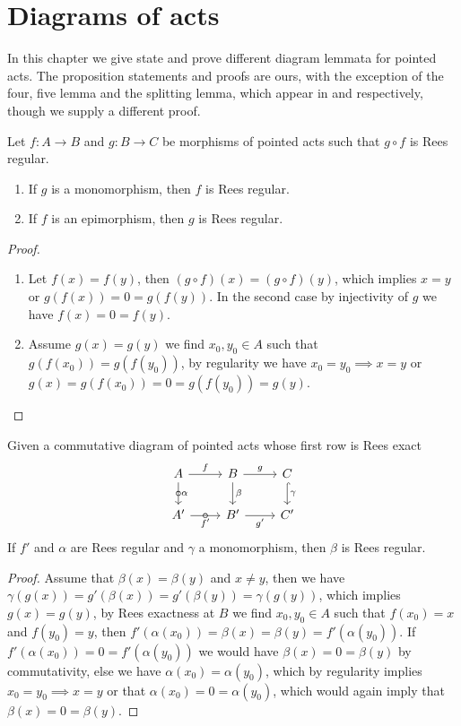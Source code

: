 \chapter{Diagrams of acts}
    In this chapter we give state and prove different diagram lemmata for pointed acts. The proposition statements and proofs are 
    ours, with the exception of the four, five lemma and the splitting lemma, which appear in \cite{Jafari19} and \cite{Chen02} respectively, though we supply 
    a different proof.
\begin{proposition}\label{regprop}
    Let $f : A\to B$ and $g: B\to C$ be morphisms of pointed acts such that $g\circ f$ is Rees regular.
    \begin{enumerate}
        \item If $g$ is a monomorphism, then $f$ is Rees regular.
        \item If $f$ is an epimorphism, then $g$ is Rees regular.
    \end{enumerate}
\end{proposition}
\begin{proof}[Proof]
    \begin{enumerate}
       \item Let $f(x)=f(y)$, then $(g\circ f)(x)=(g\circ f)(y)$, which implies $x=y$ or 
       $g(f(x))=0=g(f(y))$. In the second case by injectivity of $g$ we have $f(x)=0=f(y)$.
       \item Assume $g(x)=g(y)$ we find $x_0,y_0\in A$ such that $g(f(x_0))=g(f(y_0))$, by regularity
       we have $x_0=y_0 \implies x=y$ or $g(x)=g(f(x_0))= 0 = g(f(y_0))=g(y)$.
    \end{enumerate}
\end{proof}
\begin{lemma}\label{reglemma1}
    Given a commutative diagram of pointed acts whose first row is Rees exact
    \[\begin{tikzcd}
        A & B & C \\
        {A'} & {B'} & {C'}
        \arrow["f", from=1-1, to=1-2]
        \arrow["\alpha", "\circ"{marking}, from=1-1, to=2-1]
        \arrow["g", from=1-2, to=1-3]
        \arrow["\beta", from=1-2, to=2-2]
        \arrow["\gamma", hook, from=1-3, to=2-3]
        \arrow["{f'}"', "\circ"{marking}, from=2-1, to=2-2]
        \arrow["{g'}"', from=2-2, to=2-3]
    \end{tikzcd}\]
    If $f'$ and $\alpha$ are Rees regular and $\gamma$ a monomorphism, then $\beta$ is Rees regular.
\end{lemma}
\begin{proof}[Proof]
    Assume that $\beta(x)=\beta(y)$ and $x\neq y$, then we have $\gamma(g(x))=g'(\beta(x))=g'(\beta(y))=\gamma(g(y))$, which 
    implies $g(x)=g(y)$, by Rees exactness at $B$ we find $x_0,y_0\in A$ such that $f(x_0)=x$ and $f(y_0)=y$, then 
    $f'(\alpha(x_0))=\beta(x)=\beta(y)=f'(\alpha(y_0))$. If $f'(\alpha(x_0)) =0 = f'(\alpha(y_0))$ we would have 
    $\beta(x) = 0 = \beta(y)$ by commutativity, else we have $\alpha(x_0)=\alpha(y_0)$, which by regularity implies
    $x_0=y_0\implies x=y$ or that $\alpha(x_0)=0=\alpha(y_0)$, which would again imply that $\beta(x)=0=\beta(y)$.
\end{proof}
